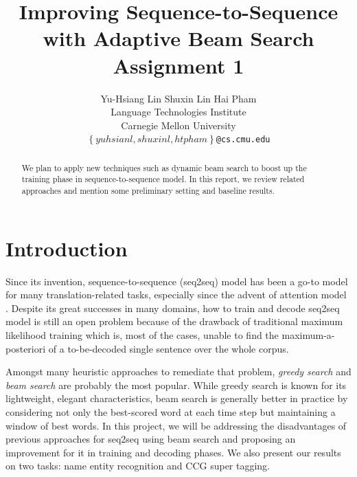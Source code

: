 \documentclass[11pt,a4paper]{article}
\title{Improving Sequence-to-Sequence with Adaptive Beam Search \newline \newline	
		Assignment 1}
\author{Yu-Hsiang Lin \quad Shuxin Lin \quad Hai Pham \\
  Language Technologies Institute \\
  Carnegie Mellon University \\
{\tt\small $\left\{yuhsianl, shuxinl, htpham\right\}$@cs.cmu.edu}
  }
\date{}
\begin{document}
\maketitle
\begin{abstract}
  We plan to apply new techniques such as dynamic beam search to boost up the training phase in sequence-to-sequence model. In this report, we review related approaches and mention some preliminary setting and baseline results. 
\end{abstract}

\section{Introduction} \label{sec:introduction}
Since its invention, sequence-to-sequence (seq2seq) model \cite{seq2seq_2014} has been a go-to model for many translation-related tasks,  %
especially since the advent of attention model \cite{bahdanau2014neural,luong2015effective}. Despite its great successes in many domains, how to train and decode seq2seq model is still an open problem because of the drawback of traditional maximum likelihood training which is, most of the cases, unable to find the maximum-a-posteriori of a to-be-decoded single sentence over the whole corpus. 

Amongst many heuristic approaches to remediate that problem, \textit{greedy search} and \textit{beam search} are probably the most popular. While greedy search is known for its lightweight, elegant characteristics, beam search is generally better in practice by considering not only the best-scored word at each time step but maintaining a window of best words. 
In this project, we will be addressing the disadvantages of previous approaches for seq2seq using beam search and proposing an improvement for it in training and decoding phases. We also present our results on two tasks: name entity recognition and CCG super tagging. 

\end{document}
